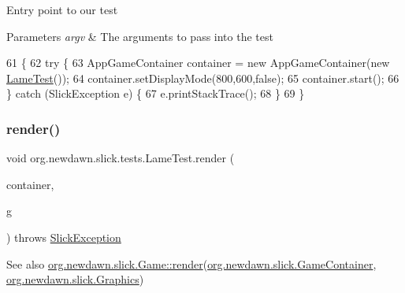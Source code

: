 Entry point to our test


\begin{DoxyParams}{Parameters}
{\em argv} & The arguments to pass into the test \\
\hline
\end{DoxyParams}

\begin{DoxyCode}
61                                            \{
62         \textcolor{keywordflow}{try} \{
63             AppGameContainer container = \textcolor{keyword}{new} AppGameContainer(\textcolor{keyword}{new} \mbox{\hyperlink{classorg_1_1newdawn_1_1slick_1_1tests_1_1_lame_test_a8a3bf60ab7c2229e1e5f062f619e8706}{LameTest}}());
64             container.setDisplayMode(800,600,\textcolor{keyword}{false});
65             container.start();
66         \} \textcolor{keywordflow}{catch} (SlickException e) \{
67             e.printStackTrace();
68         \}
69     \}
\end{DoxyCode}
\mbox{\label{classorg_1_1newdawn_1_1slick_1_1tests_1_1_lame_test_a05d29176a7cfc7088c18d1966d0d67b2}} 
\subsubsection{\texorpdfstring{render()}{render()}}
{\footnotesize\ttfamily void org.\+newdawn.\+slick.\+tests.\+Lame\+Test.\+render (\begin{DoxyParamCaption}\item[{\mbox{\hyperlink{classorg_1_1newdawn_1_1slick_1_1_game_container}{Game\+Container}}}]{container,  }\item[{\mbox{\hyperlink{classorg_1_1newdawn_1_1slick_1_1_graphics}{Graphics}}}]{g }\end{DoxyParamCaption}) throws \mbox{\hyperlink{classorg_1_1newdawn_1_1slick_1_1_slick_exception}{Slick\+Exception}}\hspace{0.3cm}{\ttfamily [inline]}}

\begin{DoxySeeAlso}{See also}
\mbox{\hyperlink{interfaceorg_1_1newdawn_1_1slick_1_1_game_af1a4670d43eb3ba04dfcf55ab1975b64}{org.\+newdawn.\+slick.\+Game\+::render}}(\mbox{\hyperlink{classorg_1_1newdawn_1_1slick_1_1_game_container}{org.\+newdawn.\+slick.\+Game\+Container}}, \mbox{\hyperlink{classorg_1_1newdawn_1_1slick_1_1_graphics}{org.\+newdawn.\+slick.\+Graphics}}) 
\end{DoxySeeAlso}


